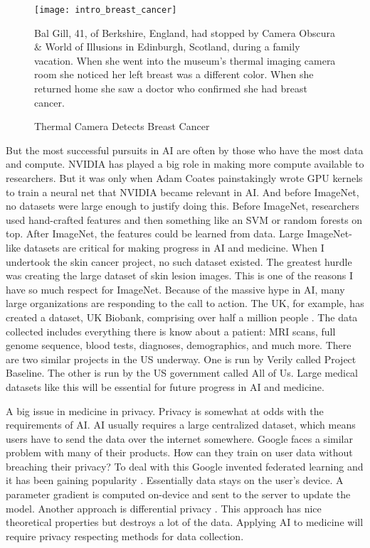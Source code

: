 \begin{figure}
\begin{center}
    \texttt{[image: intro\_breast\_cancer]}
\end{center}
\caption{Thermal Camera Detects Breast Cancer}
\vspace{12px}
Bal Gill, 41, of Berkshire, England, had stopped by Camera Obscura \& World of Illusions in Edinburgh, Scotland, during a family vacation. When she went into the museum's thermal imaging camera room she noticed her left breast was a different color. When she returned home she saw a doctor who confirmed she had breast cancer.
\vspace{12px}
\label{fig:intro_breast_cancer}
\end{figure}

But the most successful pursuits in AI are often by those who have the most data and compute.  NVIDIA has played a big role in making more compute available to researchers.  But it was only when Adam Coates painstakingly wrote GPU kernels to train a neural net \cite{coates2013deep} that NVIDIA became relevant in AI. And before ImageNet, no datasets were large enough to justify doing this.  Before ImageNet, researchers used hand-crafted features and then something like an SVM or random forests on top.  After ImageNet, the features could be learned from data.  Large ImageNet-like datasets are critical for making progress in AI and medicine.  When I undertook the skin cancer project, no such dataset existed.  The greatest hurdle was creating the large dataset of skin lesion images.  This is one of the reasons I have so much respect for ImageNet.  Because of the massive hype in AI, many large organizations are responding to the call to action.  The UK, for example, has created a dataset, UK Biobank, comprising over half a million people \cite{sudlow2015uk}.  The data collected includes everything there is know about a patient: MRI scans, full genome sequence, blood tests, diagnoses, demographics, and much more.  There are two similar projects in the US underway.  One is run by Verily called Project Baseline.  The other is run by the US government called All of Us.  Large medical datasets like this will be essential for future progress in AI and medicine.

A big issue in medicine in privacy.  Privacy is somewhat at odds with the requirements of AI.  AI usually requires a large centralized dataset, which means users have to send the data over the internet somewhere.  Google faces a similar problem with many of their products.  How can they train on user data without breaching their privacy?  To deal with this Google invented federated learning and it has been gaining popularity \cite{bonawitz2019towards}.  Essentially data stays on the user's device.  A parameter gradient is computed on-device and sent to the server to update the model.  Another approach is differential privacy \cite{abadi2016deep}.  This approach has nice theoretical properties but destroys a lot of the data.  Applying AI to medicine will require privacy respecting methods for data collection.

